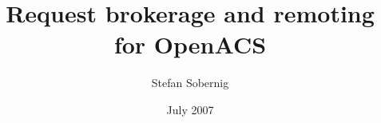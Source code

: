 
  
\title{Request brokerage and remoting for OpenACS}
\author{Stefan Sobernig}
\date{July 2007}
\maketitle
\renewcommand{\contentsname}{}
\tableofcontents 

%
%
%
  
%
%


 \newpage
 
 \newpage
    